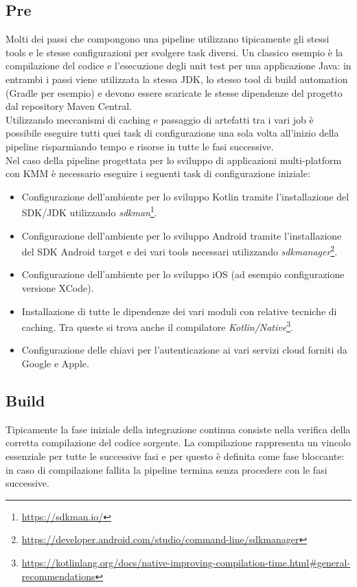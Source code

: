 \subsection{Pre}
Molti dei passi che compongono una pipeline utilizzano tipicamente gli stessi tools e le stesse configurazioni per svolgere task diversi. Un classico esempio è la compilazione del codice e l'esecuzione degli unit test per una applicazione Java: in entrambi i passi viene utilizzata la stessa JDK, lo stesso tool di build automation (Gradle per esempio) e devono essere scaricate le stesse dipendenze del progetto dal repository Maven Central.\\
Utilizzando meccanismi di caching e passaggio di artefatti tra i vari job è possibile eseguire tutti quei task di configurazione una sola volta all'inizio della pipeline risparmiando tempo e risorse in tutte le fasi successive.\\
Nel caso della pipeline progettata per lo sviluppo di applicazioni multi-platform con KMM è necessario eseguire i seguenti task di configurazione iniziale:
\begin{itemize}
    \item Configurazione dell'ambiente per lo sviluppo Kotlin tramite l'installazione del SDK/JDK utilizzando \textit{sdkman}\footnote{\url{https://sdkman.io/}}.
    \item Configurazione dell'ambiente per lo sviluppo Android tramite l'installazione del SDK Android target e dei vari tools necessari utilizzando \textit{sdkmanager}\footnote{\url{https://developer.android.com/studio/command-line/sdkmanager}}.
    \item Configurazione dell'ambiente per lo sviluppo iOS (ad esempio configurazione versione XCode).
    \item Installazione di tutte le dipendenze dei vari moduli con relative tecniche di caching. Tra queste si trova anche il compilatore \textit{Kotlin/Native}\footnote{\url{https://kotlinlang.org/docs/native-improving-compilation-time.html\#general-recommendations}}.
    \item Configurazione delle chiavi per l'autenticazione ai vari servizi cloud forniti da Google e Apple.
\end{itemize}

\subsection{Build}
Tipicamente la fase iniziale della integrazione continua consiste nella verifica della corretta compilazione del codice sorgente. La compilazione rappresenta un vincolo essenziale per tutte le successive fasi e per questo è definita come fase bloccante: in caso di compilazione fallita la pipeline termina senza procedere con le fasi successive.

